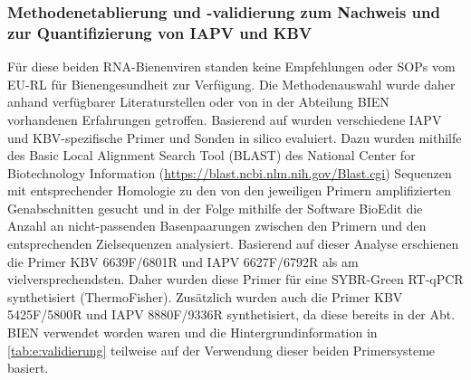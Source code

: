 \subsubsection{Methodenetablierung und -validierung zum Nachweis und zur Quantifizierung von IAPV und KBV} \label{chap:etablierung_iapv_kbv}

Für diese beiden RNA-Bienenviren standen keine Empfehlungen oder SOPs vom EU-RL für Bienengesundheit zur Verfügung. Die Methodenauswahl wurde daher anhand verfügbarer Literaturstellen \citep{coxfoster2007,demiranda2010,maori2007,palacios2008,stoltz1995,chantawannakul2006} oder von in der Abteilung BIEN vorhandenen Erfahrungen getroffen. Basierend auf \citep{demiranda2010} wurden verschiedene IAPV und KBV-spezifische Primer und Sonden in silico evaluiert. Dazu wurden mithilfe des Basic Local Alignment Search Tool (BLAST) des National Center for Biotechnology Information (\url{https://blast.ncbi.nlm.nih.gov/Blast.cgi}) Sequenzen mit entsprechender Homologie zu den von den jeweiligen Primern amplifizierten Genabschnitten gesucht und in der Folge mithilfe der Software BioEdit \citep{hall1999} die Anzahl an nicht-passenden Basenpaarungen zwischen den Primern und den entsprechenden Zielsequenzen analysiert. Basierend auf dieser Analyse erschienen die Primer KBV 6639F/6801R und IAPV 6627F/6792R \citep{demiranda2010} als am vielversprechendsten. Daher wurden diese Primer für eine SYBR-Green RT-qPCR synthetisiert (ThermoFisher). Zusätzlich wurden auch die Primer KBV 5425F/5800R \citep{stoltz1995} und IAPV 8880F/9336R \citep{maori2007} synthetisiert, da diese bereits in der Abt. BIEN verwendet worden waren und die Hintergrundinformation in \cref{tab:e:validierung} teilweise auf der Verwendung dieser beiden Primersysteme basiert.

